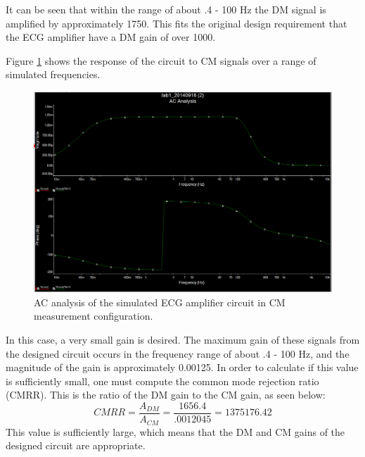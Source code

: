 \documentclass[pdftex,12pt,letterpaper]{article}
\begin{document}
It can be seen that within the range of about .4 - 100 Hz the DM signal is amplified by approximately 1750. This fits the original design requirement that the ECG amplifier have a DM gain of over 1000.

Figure \ref{fig:CM} shows the response of the circuit to CM signals over a range of simulated frequencies.
\begin{figure}[H]
\begin{center}
\includegraphics[scale=.35]{CM_analysis.png}
\caption{AC analysis of the simulated ECG amplifier circuit in CM measurement configuration.}
\label{fig:CM}
\end{center}
\end{figure}
In this case, a very small gain is desired. The maximum gain of these signals from the designed circuit occurs in the frequency range of about .4 - 100 Hz, and the magnitude of the gain is approximately 0.00125. In order to calculate if this value is sufficiently small, one must compute the common mode rejection ratio (CMRR). This is the ratio of the DM gain to the CM gain, as seen below:
$$
CMRR = \frac{A_{DM}}{A_{CM}} = \frac{1656.4}{.0012045} = 1375176.42
$$
This value is sufficiently large, which means that the DM and CM gains of the designed circuit are appropriate.
\end{document}
